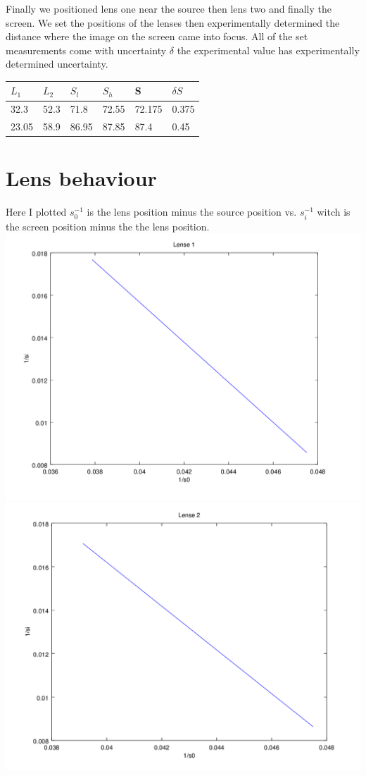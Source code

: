 \documentclass[12pt,a4paper]{article}
\begin{document}
Finally we positioned lens one near the source then lens two and finally the screen.  We set the positions of the lenses then experimentally determined the distance where the image on the screen came into focus.  All of the set measurements come with uncertainty $\delta$ the experimental value has experimentally determined uncertainty.\\

\begin{tabular}{| l | l | l | l | l | l |}
\hline
$L_1$ & $L_2$ & $S_l$ & $S_h$ & S & $\delta S$\\
\hline
32.3 & 52.3 & 71.8 & 72.55 & 72.175 & 0.375\\
\hline
23.05 & 58.9 & 86.95 & 87.85 & 87.4 & 0.45\\
\hline

\end{tabular}

\section{Lens behaviour}
Here I plotted $s_0^{-1}$ is the lens position minus the source position vs. $s_i^{-1}$ witch is the screen position minus the the lens position.\\
\includegraphics[scale=.35]{l1.png}
\includegraphics[scale=.35]{l2.png}\\
\end{document}
